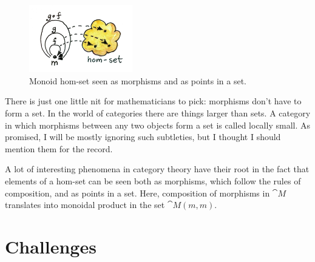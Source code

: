\begin{figure}[H]
  \centering
  \includegraphics[width=0.4\textwidth]{images/monoidhomset.jpg}
  \caption{Monoid hom-set seen as morphisms and as points in a set.}
\end{figure}

\noindent
There is just one little nit for mathematicians to pick: morphisms don't
have to form a set. In the world of categories there are things larger
than sets. A category in which morphisms between any two objects form a
set is called locally small. As promised, I will be mostly ignoring such
subtleties, but I thought I should mention them for the record.

A lot of interesting phenomena in category theory have their root in the
fact that elements of a hom-set can be seen both as morphisms, which
follow the rules of composition, and as points in a set. Here,
composition of morphisms in $\cat{M}$ translates into monoidal product in the
set $\cat{M}(m, m)$.

\section{Challenges}

